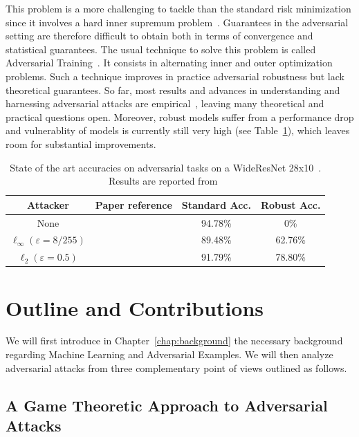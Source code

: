 This problem is a  more challenging to tackle than the standard risk minimization  since it involves a hard inner supremum problem~\citep{madry2017towards}. Guarantees in the adversarial setting are therefore difficult to obtain both in terms of convergence and statistical guarantees. The usual technique to solve this problem is called Adversarial Training~\citep{goodfellow2014explaining,madry2017towards}. It consists in alternating inner and outer optimization problems. Such a technique improves in practice adversarial robustness but lack theoretical guarantees. So far, most results and advances in understanding and harnessing adversarial attacks are empirical~\citep{ilyas2019adversarial,rice2020overfitting}, leaving many theoretical and practical questions open.  Moreover, robust models suffer from a performance drop and vulnerablity of models is currently still very high (see Table~\ref{table:sota-cifar}), which leaves room for substantial improvements.

\begin{table}[ht]
    \centering
    \begin{tabular}{c|c|c|c}
       \textbf{Attacker}  &  \textbf{Paper reference} & \textbf{Standard Acc.} & \textbf{Robust Acc.}  \\ \hline
        None & \citep{ZagoruykoK16} & 94.78\% & 0\%\\
        $\ell_\infty (\varepsilon=8/255)$&  \citep{rebuffi2021fixing}& 89.48\% & 62.76\%\\
        $\ell_2 (\varepsilon=0.5)$&  \citep{rebuffi2021fixing}& 91.79\% & 78.80\%\\
    \end{tabular}
    \caption{State of the art accuracies on adversarial tasks on a WideResNet 28x10~\citep{ZagoruykoK16}. Results are reported from~\citep{croce2020robustbench}}
\label{table:sota-cifar}
\end{table}

\section{Outline and Contributions}
We will first introduce in Chapter~\ref{chap:background} the necessary  background regarding Machine Learning and Adversarial Examples. We will then analyze  adversarial attacks from three complementary point of views outlined as follows.
\subsection{A Game Theoretic Approach to Adversarial Attacks}

